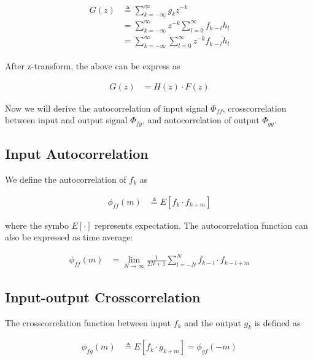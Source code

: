 \documentclass[8pt,a4paper]{article}
\begin{document}
\begin{multicols}{2}
\begin{align}
  \begin{split}
  G(z)&\triangleq \sum_{k=-\infty}^{\infty} g_{k}z^{-k}\\
      &=\sum_{k=-\infty}^{\infty} z^{-k} \sum_{l=0}^{\infty} f_{k-l}h_{l} \\
      &=\sum_{k=-\infty}^{\infty} \sum_{l=0}^{\infty} z^{-k}f_{k-l}h_{l}
  \end{split}
\end{align}

After z-transform, the above can be express as

\begin{align}
  G(z) &= H(z) \cdot F(z)
\end{align}

Now we will derive the autocorrelation of input signal $\Phi_{ff}$, crosscorrelation between input and output signal $\Phi_{fg}$, and autocorrelation of output $\Phi_{gg}$. 

\subsection*{Input Autocorrelation}
We define the autocorrelation of $f_{k}$ as

\begin{align}
  \phi_{ff}(m) &\triangleq E \left[ f_{k} \cdot f_{k+m} \right]
\end{align}

where the symbo $E[\cdot]$ represents expectation. The autocorrelation function can also be expressed as time average:

\begin{align}
  \phi_{ff}(m) &= \lim_{N\rightarrow\infty} \frac{1}{2N+1} \sum_{l=-N}^{N} f_{k-l} \cdot f_{k-l+m}
\end{align}

\subsection*{Input-output Crosscorrelation}

The crosscorrelation function between input $f_{k}$ and the output $g_{k}$ is defined as


\begin{align}
  \phi_{fg}(m) &\triangleq E \left[ f_{k} \cdot g_{k+m} \right] = \phi_{gf}(-m)
\end{align}


\end{multicols}
\end{document}

